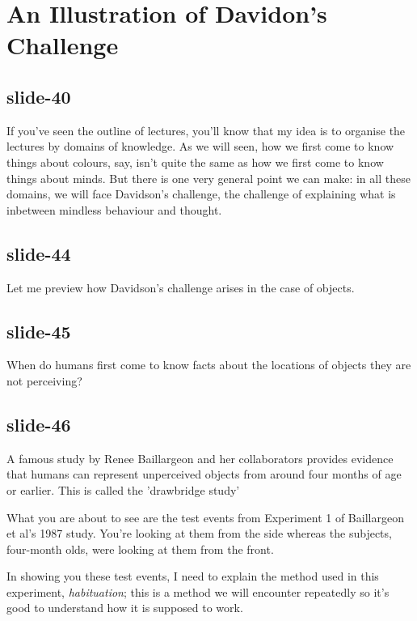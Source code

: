 \documentclass[12pt,\papersize]{extarticle}
\begin{document}
 
\section{An Illustration of Davidon's Challenge}
 
 
 
\subsection{slide-40}
If you've seen the outline of lectures, you'll know that my idea is to organise the lectures by domains of knowledge. As we will seen, how we first come to know things about colours, say, isn't quite the same as how we first come to know things about minds. But there is one very general point we can make: in all these domains, we will face Davidson's challenge, the challenge of explaining what is inbetween mindless behaviour and thought.
 
 
 
\subsection{slide-44}
Let me preview how Davidson's challenge arises in the case of objects.
 
 
 
\subsection{slide-45}
When do humans first come to know facts about the locations of objects they are not perceiving?
 
 
 
\subsection{slide-46}
A famous study by Renee Baillargeon and her collaborators provides evidence that humans can represent unperceived objects from around four months of age or earlier. This is called the 'drawbridge study'
 
What you are about to see are the test events from Experiment 1 of Baillargeon et al's 1987 study. You're looking at them from the side whereas the subjects, four-month olds, were looking at them from the front.
 
In showing you these test events, I need to explain the method used in this experiment, \emph{habituation}; this is a method we will encounter repeatedly so it's good to understand how it is supposed to work. %
 
\end{document}
